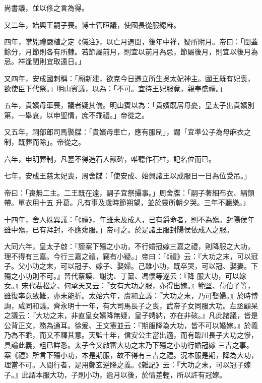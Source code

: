 \begin{pinyinscope}
 尚書議，並以佟之言為得。



 又二年，始興王嗣子喪。博士管晅議，使國長從服緦麻。



 四年，掌兇禮嚴植之定《儀注》，以亡月遇閏，後年中祥，疑所附月。帝曰：「閏蓋餘分，月節則各有所隸。若節屬前月，則宜以前月為忌，節屬後月，則宜以後月為忌。祥逢閏則宜取遠日。」



 又四年，安成國刺稱：「廟新建，欲克今日遷立所生吳太妃神主。國王既有妃喪，欲使臣下代祭。」明山賓議，以為：「不可。宜待王妃服竟，親奉盛禮。」



 五年，貴嬪母車喪，議者疑其儀。明山賓以為：「貴嬪既居母憂，皇太子出貴嬪別第，一舉哀，以申聖情，庶不乖禮。」帝從之。



 又五年，祠部郎司馬褧牒：「貴嬪母車亡，應有服制」，謂「宜準公子為母麻衣之制，既葬而除」。帝從之。



 六年，申明葬制，凡墓不得造石人獸碑，唯聽作石柱，記名位而已。



 七年，安成王慈太妃喪，周舍牒：「使安成、始興諸王以成服日一日為位受吊。」



 帝曰：「喪無二主。二王既在遠，嗣子宜祭攝事。」周舍牒：「嗣子著細布衣、絹領帶。單衣用十五
 升葛。凡有事及歲時節朔望，並於靈所朝夕哭。三年不聽樂。」



 十四年，舍人硃異議：「《禮》，年雖未及成人，已有爵命者，則不為殤。封陽侯年雖中殤，已有拜封，不應殤服。」帝可之。於是諸王服封陽侯依成人之服。



 大同六年，皇太子啟：「謹案下殤之小功，不行婚冠嫁三嘉之禮，則降服之大功，理不得有三嘉。今行三嘉之禮，竊有小疑。」帝曰：「《禮》云：『大功之末，可以冠子。父小功之末，可以冠子、嫁子、娶婦。己雖小功，既卒哭，可以冠、娶妻。下殤之小功則不可。』晉代蔡謨、謝沈、丁纂、馮懷等遂云：『降
 服大功，可以嫁女。』宋代裴松之、何承天又云：『女有大功之服，亦得出嫁。』範堅、荀伯子等，雖復率意致難，亦未能折。太始六年，虞和立議：『大功之末，乃可娶婦。』於時博詢，咸同和議。齊永明十一年，有大司馬長子之喪，武帝子女同服大功。左丞顧杲之議云：『大功之末，非直皇女嬪降無疑，皇子娉納，亦在非硋。』凡此諸議，皆是公背正文，務為通耳。徐爰、王文憲並云：『期服降為大功，皆不可以婚嫁。』於義乃為不乖，而又不釋其意。天監十年，信安公主當出適，而有臨川長子大功之慘，具論此義，粗已詳悉。太子今又啟審大功之末乃下殤之小功行婚冠嫁
 三吉之事。案《禮》所言下殤小功，本是期服，故不得有三吉之禮。況本服是期，降為大功，理當不可。人間行者，是用鄭玄逆降之義。《雜記》云：『大功之末，可以冠子嫁子。』此謂本服大功，子則小功，逾月以後，於情差輕，所以許有冠嫁。




\end{pinyinscope}
